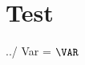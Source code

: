 \documentclass[11pt]{article}
\newcommand{\PSCHAIN}{../}
\begin{document}
\section{Test}
\PSCHAIN
Var = $\VAR$
\end{document}
